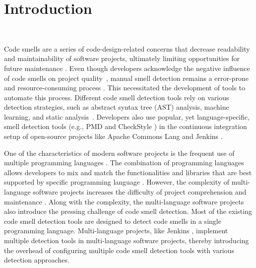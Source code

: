 \section{Introduction}~\label{sec:introduction}

\vspace*{-1em}


Code smells are a series of code-design-related concerns that decrease
readability \cite{5741260,SANTOS2018450} and maintainability
\cite{6392174,6405287} of software projects, ultimately limiting opportunities
for future maintenance \cite{Fowler_Beck}. Even though developers acknowledge
the negative influence of code smells on project quality~\cite{developersCare},
manual smell detection remains a error-prone and resource-consuming process
\cite{DetectingDefectsInObject}. This necessitated the development of tools to
automate this process. Different code smell detection tools rely on various
detection strategies, such as abstract syntax tree (AST) analysis, machine
learning, and static analysis~\cite{ML}. Developers also use popular, yet
language-specific, smell detection tools (e.g., PMD \cite{PMD} and CheckStyle
\cite{CheckStyle}) in the continuous integration setup of open-source projects
like Apache Commons Lang \cite{ApacheCommonsLang} and Jenkins \cite{Jekins}.


One of the characteristics of modern software projects is the frequent use of
multiple programming languages \cite{723183}. The combination of programming
languages allows developers to mix and match the functionalities and libraries
that are best supported by specific programming language \cite{7476675}.
However, the complexity of multi-language software projects increases the
difficulty of project comprehension and maintenance \cite{7476675,
10.1109/SCAM.2012.11, 7396422}. Along with the complexity, the multi-language
software projects also introduce the pressing challenge of code smell
detection. Most of the existing code smell detection tools are designed to
detect code smells in a single programming language. Multi-language projects,
like Jenkins \cite{Jekins}, implement multiple detection tools in
multi-language software projects, thereby introducing the overhead of
configuring multiple code smell detection tools with various detection
approaches.

